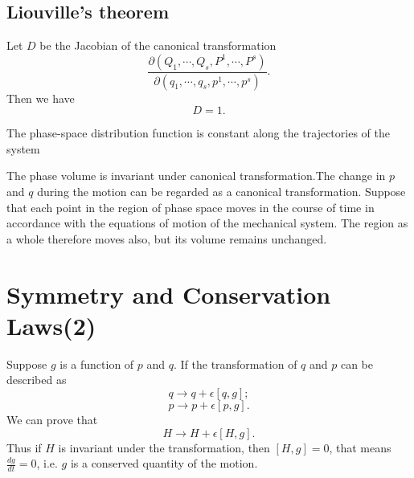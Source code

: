 \subsection{Liouville's theorem}
\begin{newlemma}
Let $D$ be the Jacobian of the canonical transformation 
\[\frac{\partial(Q_1,\cdots,Q_s,P^1,\cdots,P^s)}{\partial(q_1,\cdots,q_s,p^1,\cdots,p^s)}.\]
Then we have
\[D=1.\]
\end{newlemma}

\begin{newthem}
The phase-space distribution function is constant along the trajectories of the system
\end{newthem}

\begin{newproof}
The phase volume is invariant under canonical transformation.The change in $p$ and $q$ during the motion can be regarded as a canonical transformation. Suppose that each point in the region of phase space moves in the course of time in accordance with the equations of motion of the mechanical system. The region as a whole therefore moves also, but its volume remains unchanged.
\end{newproof}

\section{Symmetry and Conservation Laws(2)}
Suppose $g$ is a function of $p$ and $q$. If the transformation of $q$ and $p$ can be described as
\[q \rightarrow q + \epsilon [q,g];\]
\[p \rightarrow p + \epsilon [p,g].\]
We can prove that 
\[H \rightarrow H + \epsilon[H,g].\]
Thus if $H$ is invariant under the transformation, then $[H,g] = 0$, that means $\frac{dg}{dt} = 0$, i.e. $g$ is a conserved quantity of the motion.

